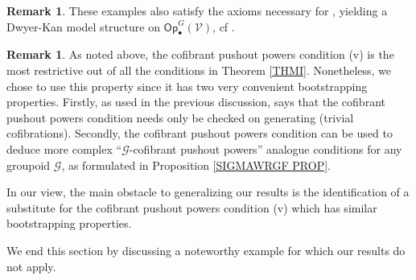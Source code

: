 \documentclass[a4paper,10pt
,draft
]{article}%
\numberwithin{equation}{section}
\numberwithin{figure}{section}
\theoremstyle{definition} %
\newtheorem{remark}[equation]{Remark}%
\newcommand{\Op}{\mathsf{Op}}%
\newcommand{\V}{\ensuremath{\mathcal V}}
\newcommand{\G}{\ensuremath{\mathcal G}}
\newcommand{\1}{\ensuremath{\mathbbm 1}}%
\begin{document}
\begin{remark}
        These examples also satisfy the axioms necessary for \cite[Thm. \ref{AC-THMA}]{BP_ACOP},
        yielding a Dwyer-Kan model structure on $\Op_\bullet^G(\V)$, cf \cite[\S \ref{AC-EXAMPLES SEC}]{BP_ACOP}.
\end{remark}


\begin{remark}\label{CPPWHY REM}
	As noted above, the cofibrant pushout powers
	condition (v) is the most restrictive 
	out of all the conditions in 
	Theorem \ref{THMI}. %
	Nonetheless, we chose to use this property 
	since it has two very convenient bootstrapping properties.
	Firstly, as used in the previous discussion, \cite[Rmk. 6.17]{BP_geo}
	says that the cofibrant pushout powers condition needs only be checked on generating (trivial cofibrations).
	Secondly, the cofibrant pushout powers condition 
	can be used to deduce more complex
	``$\G$-cofibrant pushout powers'' analogue conditions for any groupoid $\G$,
	as formulated in Proposition \ref{SIGMAWRGF PROP}.
	
	In our view, the main obstacle to generalizing our results is the identification of 
	a substitute for the cofibrant pushout powers condition (v)
	which has similar bootstrapping properties.
\end{remark}



We end this section by discussing a noteworthy 
example for which our results do not apply.
\end{document}
